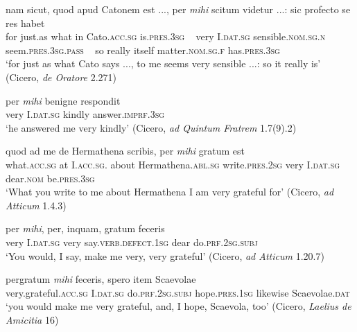 \begin{exe}
\ex
\gll nam sicut, quod apud Catonem est ..., per \emph{mihi} scitum videtur ...: sic profecto se res habet\\
for just.as what in Cato.\textsc{acc.sg} is.\textsc{pres.3sg} ~ very I.\textsc{dat.sg} sensible.\textsc{nom.sg.n} seem.\textsc{pres.3sg.pass} ~ so really itself matter.\textsc{nom.sg.f} has.\textsc{pres.3sg}\\
\trans `for just as what Cato says ..., to me seems very sensible ...: so it really is' (Cicero, \textit{de Oratore} 2.271)
\label{adjWithPer3}
\end{exe}

\begin{exe}
\ex
\gll per \emph{mihi} benigne respondit\\
very I.\textsc{dat.sg} kindly answer.\textsc{imprf.3sg}\\
\trans `he answered me very kindly' (Cicero, \textit{ad Quintum Fratrem} 1.7(9).2)
\label{adjWithPer4}
\end{exe}%

\begin{exe}
\ex
\gll quod ad me de Hermathena scribis, per \emph{mihi} gratum est\\
what.\textsc{acc.sg} at I.\textsc{acc.sg.} about Hermathena.\textsc{abl.sg} write.\textsc{pres.2sg} very I.\textsc{dat.sg} dear.\textsc{nom} be.\textsc{pres.3sg}\\
\trans `What you write to me about Hermathena I am very grateful for' (Cicero, \textit{ad Atticum} 1.4.3)
\label{adjWithPer5}
\end{exe}

\begin{exe}
\ex
\gll per \emph{mihi}, per, inquam, gratum feceris\\
very I.\textsc{dat.sg} very say.\textsc{verb.defect.1sg} dear do.\textsc{prf.2sg.subj}\\
\trans `You would, I say, make me very, very grateful' (Cicero, \textit{ad Atticum} 1.20.7)
\label{adjWithPer6}
\end{exe}

\begin{exe}
\ex
\gll pergratum \emph{mihi} feceris, spero item Scaevolae\\
very.grateful.\textsc{acc.sg} I.\textsc{dat.sg} do.\textsc{prf.2sg.subj} hope.\textsc{pres.1sg} likewise Scaevolae.\textsc{dat}\\
\trans `you would make me very grateful, and, I hope, Scaevola, too' (Cicero, \textit{Laelius de Amicitia} 16)
\label{adjWithPer7}
\end{exe}

